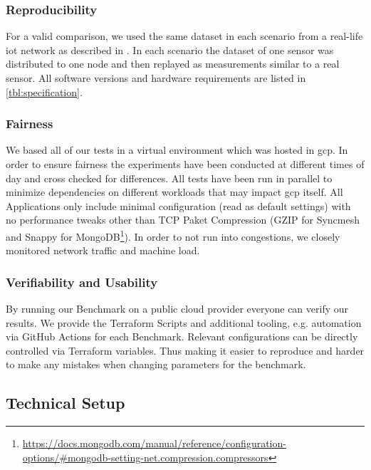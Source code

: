 \documentclass[conference]{IEEEtran}
\begin{document}
\subsubsection{Reproducibility}
For a valid comparison, we used the same dataset in each scenario from a real-life \ac{iot} network as described in . 
In each scenario the dataset of one sensor was distributed to one node and then replayed as measurements similar to a real sensor.
All software versions and hardware requirements are listed in \autoref{tbl:specification}.

\subsubsection{Fairness}\label{subsub:fairness}
We based all of our tests in a virtual environment which was hosted in \ac{gcp}. 
In order to ensure fairness the experiments have been conducted at different times of day and cross checked for differences. All tests have been run in parallel to minimize dependencies on different workloads that may impact \ac{gcp} itself. 
All Applications only include minimal configuration (read as default settings) with no performance tweaks other than TCP Paket Compression (GZIP for Syncmesh and Snappy for MongoDB\footnote{ \url{https://docs.mongodb.com/manual/reference/configuration-options/\#mongodb-setting-net.compression.compressors}}). 
In order to not run into congestions, we closely monitored network traffic and machine load.

\subsubsection{Verifiability and Usability}

By running our Benchmark on a public cloud provider everyone can verify our results. We provide the Terraform Scripts and additional tooling, e.g. automation via GitHub Actions for each Benchmark. 
Relevant configurations can be directly controlled via Terraform variables. Thus making it easier to reproduce and harder to make any mistakes when changing parameters for the benchmark. 



\subsection{Technical Setup}
\end{document}

